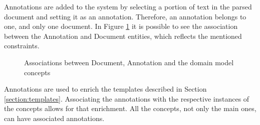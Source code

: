 \documentclass{llncs}
\begin{document}
Annotations are added to the system by selecting a portion of text in the parsed document and setting it as an annotation. Therefore, an annotation belongs to one, and only one document. In Figure \ref{figure:documentAnnotationConcepts} it is possible to see the association between the Annotation and Document entities, which reflects the mentioned constraints.

\begin{figure}
\centering
\renewcommand {\umltextcolor}{black}
\renewcommand {\umlfillcolor}{none}
\renewcommand {\umldrawcolor}{black}

\caption{Associations between Document, Annotation and the domain model concepts}
\label{figure:documentAnnotationConcepts}
\end{figure}

Annotations are used to enrich the templates described in Section \ref{section:templates}. Associating the annotations with the respective instances of the concepts allows for that enrichment. All the concepts, not only the main ones, can have associated annotations.
\end{document}
